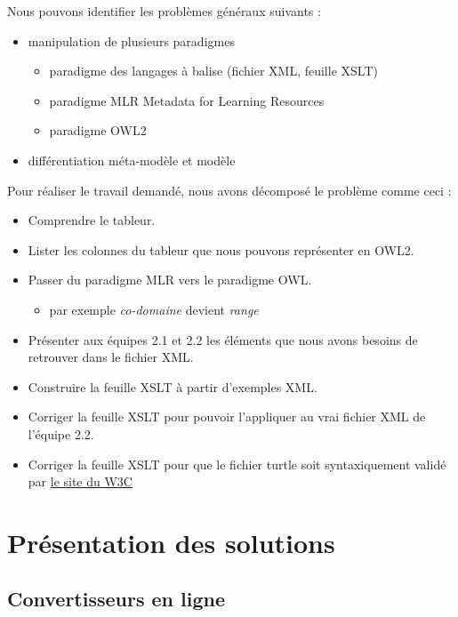 \documentclass[11pt]{report}
\begin{document}
Nous pouvons identifier les problèmes généraux suivants :
\begin{itemize}
\item manipulation de plusieurs paradigmes
  \begin{itemize}
  \item paradigme des langages à balise (fichier XML, feuille XSLT)
  \item paradigme MLR Metadata for Learning Resources
  \item paradigme OWL2
  \end{itemize}
\item différentiation méta-modèle et modèle
\end{itemize}
\hfill \break
Pour réaliser le travail demandé, nous avons décomposé le problème comme ceci :
\begin{itemize}
\item Comprendre le tableur.
\item Lister les colonnes du tableur que nous pouvons représenter en OWL2.
\item Passer du paradigme MLR vers le paradigme OWL.
  \begin{itemize}
  \item par exemple \emph{co-domaine} devient \emph{range} 
  \end{itemize}
\item Présenter aux équipes 2.1 et 2.2 les éléments que nous avons besoins de retrouver dans le fichier XML.
\item Construire la feuille XSLT à partir d'exemples XML.
\item Corriger la feuille XSLT pour pouvoir l'appliquer au vrai fichier XML de l'équipe 2.2.
\item Corriger la feuille XSLT pour que le fichier turtle soit syntaxiquement validé par \href{https://www.w3.org/2015/03/ShExValidata/}{le site du W3C}
\end{itemize}



\chapter{Présentation des solutions}

\section{Convertisseurs en ligne}
\end{document}

